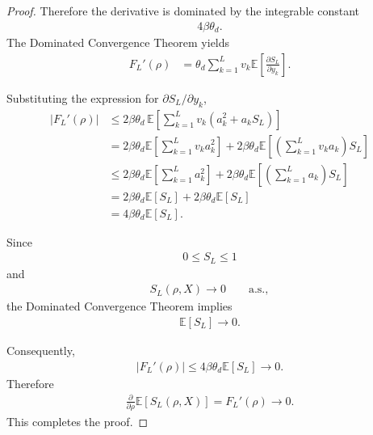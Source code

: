 \documentclass[11pt,a4paper]{article}
\theoremstyle{definition}
\begin{document}
\begin{proof}
Therefore the derivative is dominated by the integrable constant
\begin{align}
4\beta\theta_d.
\end{align}
The Dominated Convergence Theorem \cite{Royden} yields
\begin{align}
F_L'(\rho)
&=
\theta_d
\sum_{k=1}^{L}
v_k
\mathbb E
\left[
\frac{\partial S_L}{\partial y_k}
\right].
\end{align}

Substituting the expression for $\partial S_L/\partial y_k$,
\begin{align}
|F_L'(\rho)|
&\le
2\beta\theta_d
\,
\mathbb E
\left[
\sum_{k=1}^{L}
v_k
\left(
a_k^2+a_kS_L
\right)
\right]
\\
&= 2\beta\theta_d \mathbb E \left[ \sum_{k=1}^{L} v_k a_k^2\right]+  2\beta\theta_d \mathbb E\left[\left(\sum_{k=1}^L v_k a_k\right)S_L \right]\\
&\leq  2\beta\theta_d \mathbb E \left[ \sum_{k=1}^{L}  a_k^2\right]+  2\beta\theta_d \mathbb E\left[\left(\sum_{k=1}^L a_k\right)S_L \right]\\
&= 2\beta\theta_d \mathbb E [S_L]+ 2\beta\theta_d \mathbb E[S_L]\\
&= 4 \beta \theta_d \mathbb E [S_L]. 
\end{align}

Since
\begin{align}
0\le S_L\le 1
\end{align}
and
\begin{align}
S_L(\rho,X)\to 0
\qquad\text{a.s.},
\end{align}
the Dominated Convergence Theorem \cite{Royden} implies
\begin{align}
\mathbb E[S_L]
\longrightarrow 0.
\end{align}

Consequently,
\begin{align}
|F_L'(\rho)|
\le
4\beta\theta_d
\mathbb E[S_L]
\longrightarrow 0.
\end{align}
Therefore
\begin{align}
\frac{\partial}{\partial\rho}
\mathbb E[S_L(\rho,X)]
=
F_L'(\rho)
\longrightarrow 0.
\end{align}
This completes the proof.
\end{proof}
\end{document}
